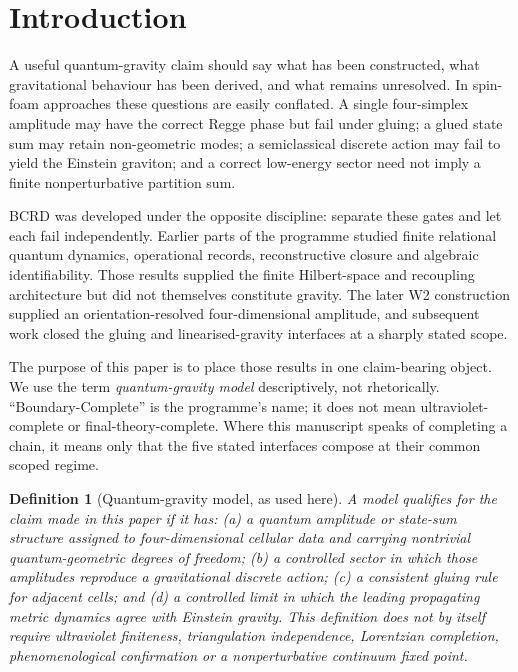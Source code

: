 \documentclass[11pt]{article}
\numberwithin{equation}{section}
\newtheorem{definition}[theorem]{Definition}
\begin{document}
\section{Introduction}

A useful quantum-gravity claim should say what has been constructed, what gravitational behaviour has been derived, and what remains unresolved. In spin-foam approaches these questions are easily conflated. A single four-simplex amplitude may have the correct Regge phase but fail under gluing; a glued state sum may retain non-geometric modes; a semiclassical discrete action may fail to yield the Einstein graviton; and a correct low-energy sector need not imply a finite nonperturbative partition sum.

BCRD was developed under the opposite discipline: separate these gates and let each fail independently. Earlier parts of the programme studied finite relational quantum dynamics, operational records, reconstructive closure and algebraic identifiability. Those results supplied the finite Hilbert-space and recoupling architecture but did not themselves constitute gravity. The later W2 construction supplied an orientation-resolved four-dimensional amplitude, and subsequent work closed the gluing and linearised-gravity interfaces at a sharply stated scope.

The purpose of this paper is to place those results in one claim-bearing object. We use the term \emph{quantum-gravity model} descriptively, not rhetorically. ``Boundary-Complete'' is the programme's name; it does not mean ultraviolet-complete or final-theory-complete. Where this manuscript speaks of completing a chain, it means only that the five stated interfaces compose at their common scoped regime.

\begin{definition}[Quantum-gravity model, as used here]\label{def:qgmodel}
A model qualifies for the claim made in this paper if it has: (a) a quantum amplitude or state-sum structure assigned to four-dimensional cellular data and carrying nontrivial quantum-geometric degrees of freedom; (b) a controlled sector in which those amplitudes reproduce a gravitational discrete action; (c) a consistent gluing rule for adjacent cells; and (d) a controlled limit in which the leading propagating metric dynamics agree with Einstein gravity. This definition does not by itself require ultraviolet finiteness, triangulation independence, Lorentzian completion, phenomenological confirmation or a nonperturbative continuum fixed point.
\end{definition}
\end{document}
